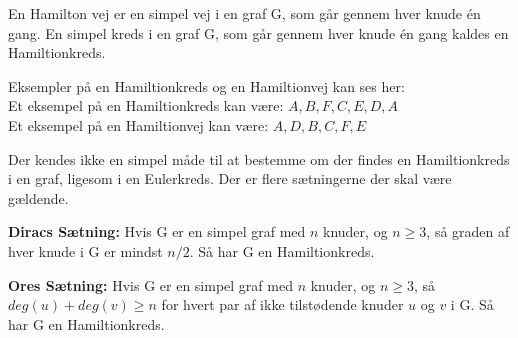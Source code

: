 \begin{defn} \label{hamiltion_defn}
En Hamilton vej er en simpel vej i en graf G, som går gennem hver knude én gang.
En simpel kreds i en graf G, som går gennem hver knude én gang kaldes en Hamiltionkreds.
\end{defn}

\begin{exmp}
Eksempler på en Hamiltionkreds og en Hamiltionvej kan ses her: \\



\noindent Et eksempel på en Hamiltionkreds kan være: $A,B,F,C,E,D,A$\\
Et eksempel på en Hamiltionvej kan være: $A,D,B,C,F,E$
\end{exmp}

Der kendes ikke en simpel måde til at bestemme om der findes en Hamiltionkreds i en graf, ligesom i en Eulerkreds. Der er flere sætningerne der skal være gældende.

\begin{thm} \label{diracs_thm}
\textbf{Diracs Sætning:} 
Hvis G er en simpel graf med $n$ knuder, og $n\geq3$, så graden af hver knude i G er mindst $n/2$. 
Så har G en Hamiltionkreds.  
\end{thm}

\begin{thm} \label{diracs_thm}
\textbf{Ores Sætning:} 
Hvis G er en simpel graf med $n$ knuder, og $n\geq3$, så\\ $deg(u)+deg(v)\geq n$ for hvert par af ikke tilstødende knuder $u$ og $v$ i G. 
Så har G en Hamiltionkreds. 
\end{thm}

